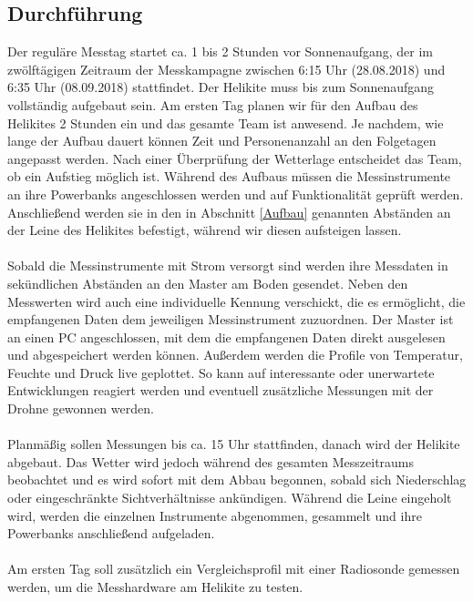 \documentclass[a4paper,11pt,DIV=calc,tablecaptionabove,headinclude,twoside]{article}
\begin{document}
\subsection{Durchführung}

Der reguläre Messtag startet ca. 1 bis 2 Stunden vor Sonnenaufgang, der im zwölftägigen Zeitraum der Messkampagne zwischen 6:15 Uhr (28.08.2018) und 6:35 Uhr (08.09.2018) stattfindet. Der Helikite muss bis zum Sonnenaufgang vollständig aufgebaut sein. Am ersten Tag planen wir für den Aufbau des Helikites 2 Stunden ein und das gesamte Team ist anwesend. Je nachdem, wie lange der Aufbau dauert können Zeit und Personenanzahl an den Folgetagen angepasst werden. Nach einer Überprüfung der Wetterlage entscheidet das Team, ob ein Aufstieg möglich ist. Während des Aufbaus müssen die Messinstrumente an ihre Powerbanks angeschlossen werden und auf Funktionalität geprüft werden. Anschließend werden sie in den in Abschnitt \ref{Aufbau} genannten Abständen an der Leine des Helikites befestigt, während wir diesen aufsteigen lassen. \\\\
Sobald die Messinstrumente mit Strom versorgt sind werden ihre Messdaten in sekündlichen Abständen an den Master am Boden gesendet. Neben den Messwerten wird auch eine individuelle Kennung verschickt, die es ermöglicht, die empfangenen Daten dem jeweiligen Messinstrument zuzuordnen. Der Master ist an einen PC angeschlossen, mit dem die empfangenen Daten direkt ausgelesen und abgespeichert werden können. Außerdem werden die Profile von Temperatur, Feuchte und Druck live geplottet. So kann auf interessante oder unerwartete Entwicklungen reagiert werden und eventuell zusätzliche Messungen mit der Drohne gewonnen werden.\\\\
Planmäßig sollen Messungen bis ca. 15 Uhr stattfinden, danach wird der Helikite abgebaut. Das Wetter wird jedoch während des gesamten Messzeitraums beobachtet und es wird sofort mit dem Abbau begonnen, sobald sich Niederschlag oder eingeschränkte Sichtverhältnisse ankündigen. Während die Leine eingeholt wird, werden die einzelnen Instrumente abgenommen, gesammelt und ihre Powerbanks anschließend aufgeladen. \\\\
Am ersten Tag soll zusätzlich ein Vergleichsprofil mit einer Radiosonde gemessen werden, um die Messhardware am Helikite zu testen. \\\\
\end{document}
